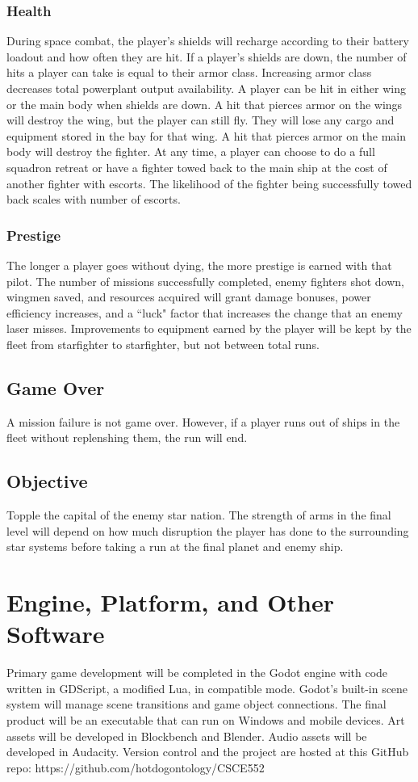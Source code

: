 \documentclass[journal]{IEEEtran}
\begin{document}
\subsubsection{Health} 
During space combat, the player's shields will recharge according to their battery loadout and how often they are hit. If a player's shields are down, the number of hits a player can take is equal to their armor class. Increasing armor class decreases total powerplant output availability. A player can be hit in either wing or the main body when shields are down. A hit that pierces armor on the wings will destroy the wing, but the player can still fly. They will lose any cargo and equipment stored in the bay for that wing. A hit that pierces armor on the main body will destroy the fighter. At any time, a player can choose to do a full squadron retreat or have a fighter towed back to the main ship at the cost of another fighter with escorts. The likelihood of the fighter being successfully towed back scales with number of escorts.

\subsubsection{Prestige}
The longer a player goes without dying, the more prestige is earned with that pilot. The number of missions successfully completed, enemy fighters shot down, wingmen saved, and resources acquired will grant damage bonuses, power efficiency increases, and a ``luck" factor that increases the change that an enemy laser misses. Improvements to equipment earned by the player will be kept by the fleet from starfighter to starfighter, but not between total runs.

\subsection{Game Over}
A mission failure is not game over. However, if a player runs out of ships in the fleet without replenshing them, the run will end. 

\subsection{Objective}
Topple the capital of the enemy star nation. The strength of arms in the final level will depend on how much disruption the player has done to the surrounding star systems before taking a run at the final planet and enemy ship. 

\section{Engine, Platform, and Other Software}
Primary game development will be completed in the Godot engine with code written in GDScript, a modified Lua, in compatible mode. Godot's built-in scene system will manage scene transitions and game object connections. The final product will be an executable that can run on Windows and mobile devices. Art assets will be developed in Blockbench and Blender. Audio assets will be developed in Audacity. Version control and the project are hosted at this GitHub repo: https://github.com/hotdogontology/CSCE552 
\end{document}
